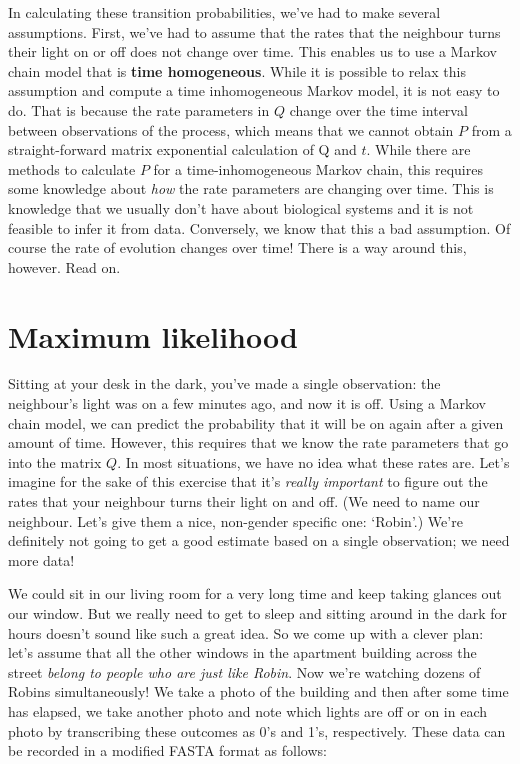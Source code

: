 \documentclass[12pt,twoside,openright]{book}
\begin{document}
In calculating these transition probabilities, we've had to make several assumptions.  First, we've had to assume that the rates that the neighbour turns their light on or off does not change over time.  This enables us to use a Markov chain model that is \textbf{time homogeneous}.  While it is possible to relax this assumption and compute a time inhomogeneous Markov model, it is not easy to do.  That is because the rate parameters in $Q$ change over the time interval between observations of the process, which means that we cannot obtain $P$ from a straight-forward matrix exponential calculation of Q and $t$.  While there are methods to calculate $P$ for a time-inhomogeneous Markov chain, this requires some knowledge about {\it how} the rate parameters are changing over time.  This is knowledge that we usually don't have about biological systems and it is not feasible to infer it from data.  Conversely, we know that this a bad assumption.  Of course the rate of evolution changes over time!  There is a way around this, however.  Read on.


\section {Maximum likelihood}

Sitting at your desk in the dark, you've made a single observation: the neighbour's light was on a few minutes ago, and now it is off.  Using a Markov chain model, we can predict the probability that it will be on again after a given amount of time.  However, this requires that we know the rate parameters that go into the matrix $Q$.  In most situations, we have no idea what these rates are.  Let's imagine for the sake of this exercise that it's \textit{really important} to figure out the rates that your neighbour turns their light on and off.  (We need to name our neighbour.  Let's give them a nice, non-gender specific one: `Robin'.)  We're definitely not going to get a good estimate based on a single observation; we need more data!

We could sit in our living room for a very long time and keep taking glances out our window.  But we really need to get to sleep and sitting around in the dark for hours doesn't sound like such a great idea.  So we come up with a clever plan: let's assume that all the other windows in the apartment building across the street \textit{belong to people who are just like Robin}.  Now we're watching dozens of Robins simultaneously!  We take a photo of the building and then after some time has elapsed, we take another photo and note which lights are off or on in each photo by transcribing these outcomes as 0's and 1's, respectively.  These data can be recorded in a modified FASTA format as follows: 
\end{document}
